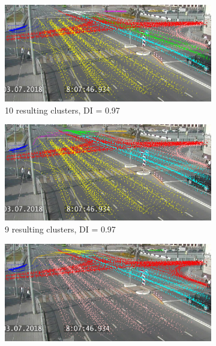 \begin{figure}[!htb]
	\centering
	\begin{subfigure}[!htb]{0.495\textwidth}
		\centering{}
		\includegraphics[width=\textwidth]{images/10cl-rdp-n-1.png}
		\caption{10 resulting clusters, DI = 0.97}
		\label{fig:10cl-rdp-n-1}
	\end{subfigure}
	\hfill
	\begin{subfigure}[!htb]{0.495\textwidth}
		\centering{}
		\includegraphics[width=\textwidth]{images/9cl-rdp-n-1.png}
		\caption{9 resulting clusters, DI = 0.97}
		\label{fig:9cl-rdp-n-1}
	\end{subfigure}
	\hfill
	\begin{subfigure}[!htb]{0.495\textwidth}
		\centering{}
		\includegraphics[width=\textwidth]{images/8cl-rdp-n-1.png}

\end{subfigure}
\end{figure}
